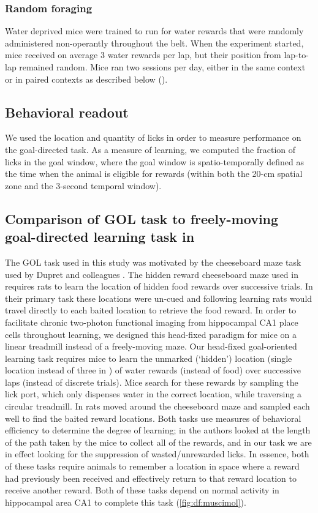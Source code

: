 \subsubsection{Random foraging}
Water deprived mice were trained to run for water rewards that were randomly administered non-operantly throughout the belt. When the experiment started, mice received on average 3 water rewards per lap, but their position from lap-to-lap remained random. Mice ran two sessions per day, either in the same context or in paired contexts as described below ().

\subsection{Behavioral readout}
We used the location and quantity of licks in order to measure performance on the goal-directed task. As a measure of learning, we computed the fraction of licks in the goal window, where the goal window is spatio-temporally defined as the time when the animal is eligible for rewards (within both the 20-cm spatial zone and the 3-second temporal window).

\subsection{Comparison of GOL task to freely-moving goal-directed learning task in \citeauthor{Dupret2010a}}\label{sec:df:methods:comp}
The GOL task used in this study was motivated by the cheeseboard maze task used by Dupret and colleagues \citep{Dupret2010a}. The hidden reward cheeseboard maze used in \citeauthor{Dupret2010a} requires rats to learn the location of hidden food rewards over successive trials. In their primary task these locations were un-cued and following learning rats would travel directly to each baited location to retrieve the food reward. In order to facilitate chronic two-photon functional imaging from hippocampal CA1 place cells throughout learning, we designed this head-fixed paradigm for mice on a linear treadmill instead of a freely-moving maze. Our head-fixed goal-oriented learning task requires mice to learn the unmarked (`hidden') location (single location instead of three in \citeauthor{Dupret2010a}) of water rewards (instead of food) over successive laps (instead of discrete trials). Mice search for these rewards by sampling the lick port, which only dispenses water in the correct location, while traversing a circular treadmill. In \citeauthor{Dupret2010a} rats moved around the cheeseboard maze and sampled each well to find the baited reward locations. Both tasks use measures of behavioral efficiency to determine the degree of learning; in \citeauthor{Dupret2010a} the authors looked at the length of the path taken by the mice to collect all of the rewards, and in our task we are in effect looking for the suppression of wasted/unrewarded licks. In essence, both of these tasks require animals to remember a location in space where a reward had previously been received and effectively return to that reward location to receive another reward. Both of these tasks depend on normal activity in hippocampal area CA1 to complete this task (\autoref{fig:df:muscimol}).


